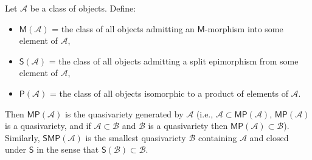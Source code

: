 Let $\mathcal{A}$ be a class of objects. Define:
\begin{itemize}
\item $\mathsf{M}(\mathcal{A})$ = the class of all objects admitting an $\mathsf{M}$-morphism into some element of $\mathcal{A}$,
\item $\mathsf{S}(\mathcal{A})$ = the class of all objects admitting a split epimorphism from some element of $\mathcal{A}$,
\item $\mathsf{P}(\mathcal{A})$ = the class of all objects isomorphic to a product of elements of $\mathcal{A}$.
\end{itemize}
Then $\mathsf{MP}(\mathcal{A})$ is the quasivariety generated by $\mathcal{A}$ (i.e., $\mathcal{A} \subset \mathsf{MP}(\mathcal{A})$, $\mathsf{MP}(\mathcal{A})$ is a quasivariety, and if $\mathcal{A} \subset \mathcal{B}$ and $\mathcal{B}$ is a quasivariety then $\mathsf{MP}(\mathcal{A}) \subset \mathcal{B}$). Similarly, $\mathsf{SMP}(\mathcal{A})$ is the smallest quasivariety $\mathcal{B}$ containing $\mathcal{A}$ and closed under $\mathsf{S}$ in the sense that $\mathsf{S}(\mathcal{B}) \subset \mathcal{B}$.
